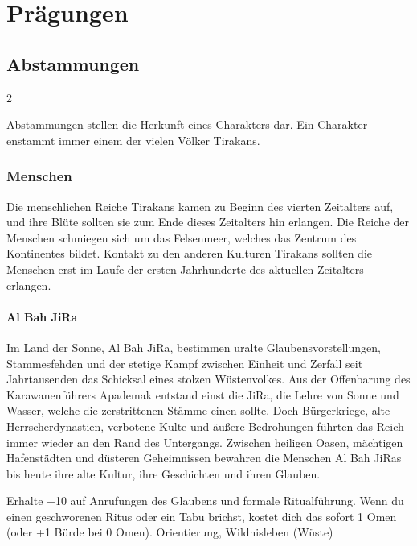 \chapter{Prägungen}
\label{app:marks}


\section{Abstammungen}\label{sec:abstammungen}

{
    \begin{multicols*}{2}

        Abstammungen stellen die Herkunft eines Charakters dar. Ein Charakter enstammt immer einem der vielen Völker Tirakans.

        \subsection{Menschen}\label{subsec:abstammungen-menschen}
        Die menschlichen Reiche Tirakans kamen zu Beginn des vierten Zeitalters auf, und ihre Blüte sollten sie zum Ende dieses Zeitalters hin erlangen. Die Reiche der Menschen schmiegen sich um das Felsenmeer, welches das Zentrum des Kontinentes bildet. Kontakt zu den anderen Kulturen Tirakans sollten die Menschen erst im Laufe der ersten Jahrhunderte des aktuellen Zeitalters erlangen.

        \subsubsection*{Al Bah JiRa}
        Im Land der Sonne, Al Bah JiRa, bestimmen uralte Glaubensvorstellungen, Stammesfehden und der stetige Kampf zwischen Einheit und Zerfall seit Jahrtausenden das Schicksal eines stolzen Wüstenvolkes. Aus der Offenbarung des Karawanenführers Apademak entstand einst die JiRa, die Lehre von Sonne und Wasser, welche die zerstrittenen Stämme einen sollte. Doch Bürgerkriege, alte Herrscherdynastien, verbotene Kulte und äußere Bedrohungen führten das Reich immer wieder an den Rand des Untergangs. Zwischen heiligen Oasen, mächtigen Hafenstädten und düsteren Geheimnissen bewahren die Menschen Al Bah JiRas bis heute ihre alte Kultur, ihre Geschichten und ihren Glauben.

        \abstammungspielwertebox
        {Erhalte +10 auf Anrufungen des Glaubens und formale Ritualführung.}
        {Wenn du einen geschworenen Ritus oder ein Tabu brichst, kostet dich das sofort 1 Omen (oder +1 Bürde bei 0 Omen).}
        {Orientierung, Wildnisleben (Wüste)}


\end{multicols*}}
